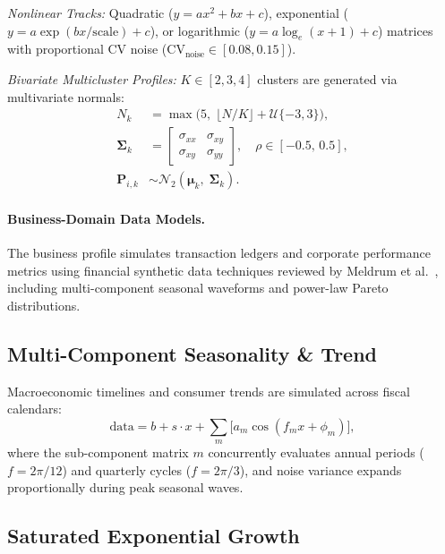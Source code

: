 \documentclass[11pt,twocolumn]{article}
\newcommand{\N}{\mathcal{N}}
\begin{document}
\noindent\emph{Nonlinear Tracks:} Quadratic ($y = ax^2 + bx + c$), exponential ($y = a\exp(bx/\text{scale}) + c$), or logarithmic ($y = a\log_e(x+1)+c$) matrices with proportional CV noise ($\text{CV}_{\text{noise}} \in [0.08, 0.15]$).

\noindent\emph{Bivariate Multicluster Profiles:}
$K \in [2,3,4]$ clusters are generated via multivariate normals:
\begin{align}
  N_k &= \max\bigl(5,\;\lfloor N/K \rfloor + \mathcal{U}\{-3,3\}\bigr), \label{eq:cluster_size}\\
  \bm{\Sigma}_k &= \begin{bmatrix} \sigma_{xx} & \sigma_{xy}\\ \sigma_{xy} & \sigma_{yy}\end{bmatrix},\quad \rho \in [-0.5,\,0.5], \label{eq:cluster_cov}\\
  \mathbf{P}_{i,k} &\sim \N_2(\bm{\mu}_k,\;\bm{\Sigma}_k). \label{eq:cluster_sample}
\end{align}

\paragraph{Business-Domain Data Models.}
The business profile simulates transaction ledgers and corporate performance metrics using financial synthetic data techniques reviewed by Meldrum et al.~\cite{meldrum2025newmoney}, including multi-component seasonal waveforms and power-law Pareto distributions.

\subsection{Multi-Component Seasonality \& Trend}\label{sec:seasonal}

Macroeconomic timelines and consumer trends are simulated across fiscal calendars:
\begin{equation}\label{eq:seasonal}
  \text{data} = b + s \cdot x + \sum_{m}\bigl[a_m \cos(f_m x + \phi_m)\bigr],
\end{equation}
where the sub-component matrix $m$ concurrently evaluates annual periods ($f = 2\pi/12$) and quarterly cycles ($f = 2\pi/3$), and noise variance expands proportionally during peak seasonal waves.

\subsection{Saturated Exponential Growth}\label{sec:satgrowth}
\end{document}
